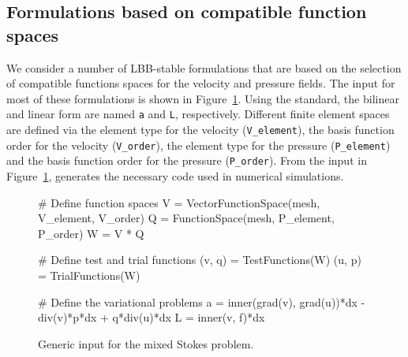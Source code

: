 \subsection{Formulations based on compatible function spaces}

We consider a number of LBB-stable formulations that are based on the
selection of compatible functions spaces for the velocity and pressure
fields.  The \ufl{} input for most of these formulations is shown in
Figure~\ref{code:terrel:var:mixed}.  Using the \ufl{} standard, the
bilinear and linear form are named {\tt a} and {\tt L}, respectively.
Different finite element spaces are defined via the element type for
the velocity ({\tt V\_element}), the basis function order for the velocity
({\tt V\_order}), the element type for the pressure ({\tt P\_element}) and
the basis function order for the pressure ({\tt P\_order}). From the input
in Figure~\ref{code:terrel:var:mixed}, \ffc{} generates the necessary
code used in numerical simulations.
%
\begin{figure}
\begin{python}
# Define function spaces
V = VectorFunctionSpace(mesh, V_element, V_order)
Q = FunctionSpace(mesh, P_element, P_order)
W = V * Q

# Define test and trial functions
(v, q) = TestFunctions(W)
(u, p) = TrialFunctions(W)

# Define the variational problems
a = inner(grad(v), grad(u))*dx - div(v)*p*dx + q*div(u)*dx
L = inner(v, f)*dx
\end{python}
\caption{Generic \ufl{} input for the mixed Stokes problem.}
\label{code:terrel:var:mixed}
\end{figure}


